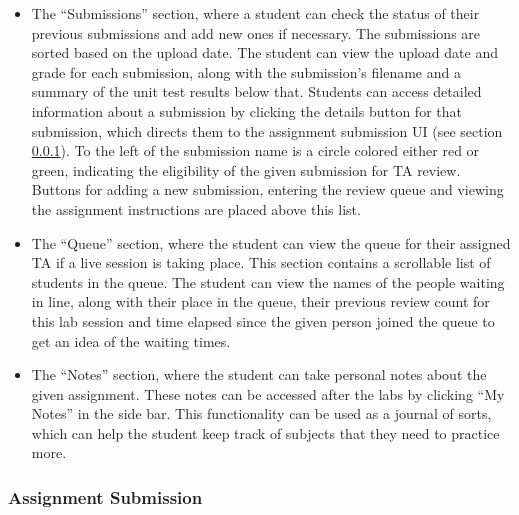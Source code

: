 \documentclass[a4paper, 12pt]{article}
\begin{document}
    \begin{itemize}
      \item The ``Submissions'' section, where a student can check the status of their previous submissions and add new ones if necessary.
            The submissions are sorted based on the upload date. The student can view the upload date and grade for each submission,
            along with the submission's filename and a summary of the unit test results below that. Students can access detailed
            information about a submission by clicking the details button for that submission, which directs them to the
            assignment submission UI (see section \ref{student_submission}). To the left of the submission name is a circle colored either red or
            green, indicating the eligibility of the given submission for TA review. Buttons for adding a new submission, entering the
            review queue and viewing the assignment instructions are placed above this list.
      \item The ``Queue'' section, where the student can view the queue for their assigned TA if a live session is taking place. This section
            contains a scrollable list of students in the queue. The student can view the names of the people waiting in line, along with their
            place in the queue, their previous review count for this lab session and time elapsed since the given person joined the queue to get an idea
            of the waiting times.
      \item The ``Notes'' section, where the student can take personal notes about the given assignment. These notes can be accessed
            after the labs by clicking ``My Notes'' in the side bar. This functionality can be used as a journal of sorts, which can
            help the student keep track of subjects that they need to practice more.
    \end{itemize}
    
    \pagebreak
    
    \subsubsection{Assignment Submission} \label{student_submission}
    
\end{document}
